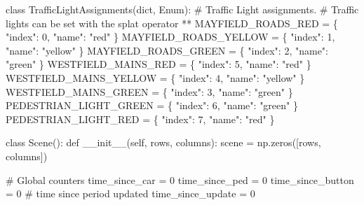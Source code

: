 \documentclass[
  letterpaper,
  DIV=11,
  numbers=noendperiod]{scrartcl}
\newenvironment{Shaded}{\begin{snugshade}}{\end{snugshade}}
\newcommand{\BuiltInTok}[1]{\textcolor[rgb]{0.00,0.23,0.31}{#1}}
\newcommand{\CommentTok}[1]{\textcolor[rgb]{0.37,0.37,0.37}{#1}}
\newcommand{\DecValTok}[1]{\textcolor[rgb]{0.68,0.00,0.00}{#1}}
\newcommand{\FunctionTok}[1]{\textcolor[rgb]{0.28,0.35,0.67}{#1}}
\newcommand{\KeywordTok}[1]{\textcolor[rgb]{0.00,0.23,0.31}{#1}}
\newcommand{\NormalTok}[1]{\textcolor[rgb]{0.00,0.23,0.31}{#1}}
\newcommand{\OperatorTok}[1]{\textcolor[rgb]{0.37,0.37,0.37}{#1}}
\newcommand{\StringTok}[1]{\textcolor[rgb]{0.13,0.47,0.30}{#1}}
\newcommand{\VariableTok}[1]{\textcolor[rgb]{0.07,0.07,0.07}{#1}}
\begin{document}
\begin{Shaded}
\begin{Highlighting}[]
\KeywordTok{class}\NormalTok{ TrafficLightAssignments(}\BuiltInTok{dict}\NormalTok{, Enum):}
    \CommentTok{\# Traffic Light assignments. }
    \CommentTok{\# Traffic lights can be set with the splat operator **}
\NormalTok{    MAYFIELD\_ROADS\_RED }\OperatorTok{=}\NormalTok{ \{}
        \StringTok{"index"}\NormalTok{: }\DecValTok{0}\NormalTok{,}
        \StringTok{"name"}\NormalTok{: }\StringTok{"red"}
\NormalTok{    \}}
\NormalTok{    MAYFIELD\_ROADS\_YELLOW }\OperatorTok{=}\NormalTok{ \{}
        \StringTok{"index"}\NormalTok{: }\DecValTok{1}\NormalTok{,}
        \StringTok{"name"}\NormalTok{: }\StringTok{"yellow"}
\NormalTok{    \}}
\NormalTok{    MAYFIELD\_ROADS\_GREEN }\OperatorTok{=}\NormalTok{ \{}
        \StringTok{"index"}\NormalTok{: }\DecValTok{2}\NormalTok{,}
        \StringTok{"name"}\NormalTok{: }\StringTok{"green"}
\NormalTok{    \}}
\NormalTok{    WESTFIELD\_MAINS\_RED }\OperatorTok{=}\NormalTok{ \{}
        \StringTok{"index"}\NormalTok{: }\DecValTok{5}\NormalTok{,}
        \StringTok{"name"}\NormalTok{: }\StringTok{"red"}
\NormalTok{    \}}
\NormalTok{    WESTFIELD\_MAINS\_YELLOW }\OperatorTok{=}\NormalTok{ \{}
        \StringTok{"index"}\NormalTok{: }\DecValTok{4}\NormalTok{,}
        \StringTok{"name"}\NormalTok{: }\StringTok{"yellow"}
\NormalTok{    \}}
\NormalTok{    WESTFIELD\_MAINS\_GREEN }\OperatorTok{=}\NormalTok{ \{}
        \StringTok{"index"}\NormalTok{: }\DecValTok{3}\NormalTok{,}
        \StringTok{"name"}\NormalTok{: }\StringTok{"green"}
\NormalTok{    \}}
\NormalTok{    PEDESTRIAN\_LIGHT\_GREEN }\OperatorTok{=}\NormalTok{ \{}
        \StringTok{"index"}\NormalTok{: }\DecValTok{6}\NormalTok{,}
        \StringTok{"name"}\NormalTok{: }\StringTok{"green"}
\NormalTok{    \}}
\NormalTok{    PEDESTRIAN\_LIGHT\_RED }\OperatorTok{=}\NormalTok{ \{}
        \StringTok{"index"}\NormalTok{: }\DecValTok{7}\NormalTok{,}
        \StringTok{"name"}\NormalTok{: }\StringTok{"red"}
\NormalTok{    \}}

\KeywordTok{class}\NormalTok{ Scene():}
    \KeywordTok{def} \FunctionTok{\_\_init\_\_}\NormalTok{(}\VariableTok{self}\NormalTok{, rows, columns):}
\NormalTok{        scene }\OperatorTok{=}\NormalTok{ np.zeros([rows, columns])}
    
    \CommentTok{\# Global counters}
\NormalTok{    time\_since\_car }\OperatorTok{=} \DecValTok{0}
\NormalTok{    time\_since\_ped }\OperatorTok{=} \DecValTok{0}
\NormalTok{    time\_since\_button }\OperatorTok{=} \DecValTok{0}
    \CommentTok{\# time since period updated}
\NormalTok{    time\_since\_update }\OperatorTok{=} \DecValTok{0}


\end{Highlighting}
\end{Shaded}
\end{document}
